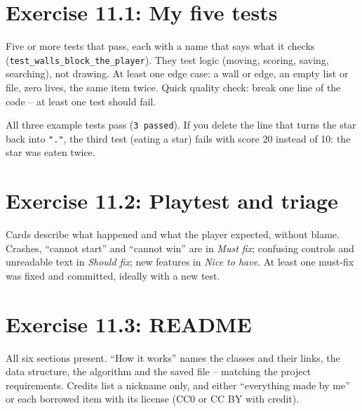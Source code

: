 
\section{Exercise 11.1: My five tests}
\begin{answer}
Five or more tests that pass, each with a name that says what it checks (\texttt{test\_walls\_block\_the\_player}). They test logic (moving, scoring, saving, searching), not drawing. At least one edge case: a wall or edge, an empty list or file, zero lives, the same item twice. Quick quality check: break one line of the code -- at least one test should fail.
\end{answer}
\begin{answer}
All three example tests pass (\texttt{3 passed}). If you delete the line that turns the star back into \texttt{"."}, the third test (eating a star) fails with score 20 instead of 10: the star was eaten twice.
\end{answer}

\section{Exercise 11.2: Playtest and triage}
\begin{answer}
Cards describe what happened and what the player expected, without blame. Crashes, \enquote{cannot start} and \enquote{cannot win} are in \emph{Must fix}; confusing controls and unreadable text in \emph{Should fix}; new features in \emph{Nice to have}. At least one must-fix was fixed and committed, ideally with a new test.
\end{answer}

\section{Exercise 11.3: README}
\begin{answer}
All six sections present. \enquote{How it works} names the classes and their links, the data structure, the algorithm and the saved file -- matching the project requirements. Credits list a nickname only, and either \enquote{everything made by me} or each borrowed item with its license (CC0 or CC BY with credit).
\end{answer}

